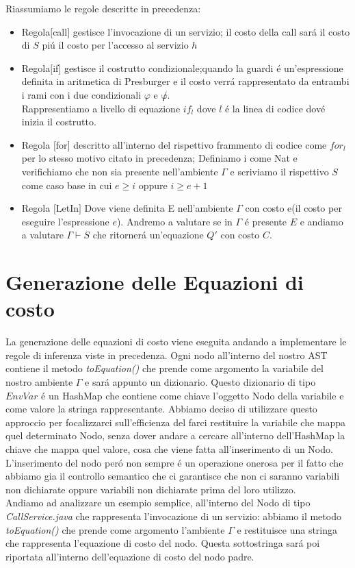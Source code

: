 \documentclass[../../main.tex]{subfiles}
\begin{document}
Riassumiamo le regole descritte in precedenza:\\
\begin{itemize}
    \item Regola$[$call$]$ gestisce l'invocazione di un servizio; il costo della call sará il costo di $S$ piú il costo per l'accesso al servizio $h$ 
    \item Regola$[$if$]$ gestisce il costrutto condizionale;quando la guardi é un'espressione definita in aritmetica di Presburger e il costo verrá rappresentato da entrambi i rami con i due condizionali $\varphi $ e $\not \varphi$.\\Rappresentiamo a livello di equazione $if_l$ dove $l$ é la linea di codice dové inizia il costrutto.
    \item Regola $[$for$]$ descritto all'interno del rispettivo frammento di codice come $for_l$ per lo stesso motivo citato in precedenza; Definiamo i come Nat e verifichiamo che non sia presente nell'ambiente $\varGamma$ e scriviamo il rispettivo $S$ come caso base in cui $e \geq i$ oppure $i \geq e + 1$
    \item Regola $[$LetIn$]$ Dove viene definita E nell'ambiente $\varGamma$ con costo e(il costo per eseguire l'espressione $e$). Andremo a valutare se in $\varGamma$ é presente $E$ e andiamo a valutare $\varGamma \vdash S$ che ritornerá un'equazione $Q'$ con costo $C$.
\end{itemize}
\section{Generazione delle Equazioni di costo}

La generazione delle equazioni di costo viene eseguita andando a implementare le regole di inferenza viste in precedenza.
Ogni nodo all'interno del nostro AST contiene il metodo \textit{toEquation()} che prende come argomento la variabile del nostro ambiente $\varGamma$ e sará appunto un dizionario.
Questo dizionario di tipo $EnvVar$ é un HashMap che contiene come chiave l'oggetto Nodo della variabile e come valore la stringa rappresentante.
Abbiamo deciso di utilizzare questo approccio per focalizzarci sull'efficienza del farci restituire la variabile che mappa quel determinato Nodo, senza dover andare a cercare all'interno dell'HashMap la chiave che mappa quel valore, cosa che viene fatta all'inserimento di un Nodo.
L'inserimento del nodo peró non sempre é un operazione onerosa per il fatto che abbiamo gia il controllo semantico che ci garantisce che non ci saranno variabili non dichiarate oppure variabili non dichiarate prima del loro utilizzo.\\
Andiamo ad analizzare un esempio semplice, all'interno del Nodo di tipo \textit{CallService.java} che rappresenta l'invocazione di un servizio: abbiamo il metodo \textit{toEquation()} che prende come argomento l'ambiente $\varGamma$ e restituisce una stringa che rappresenta l'equazione di costo del nodo. Questa sottostringa sará poi riportata all'interno dell'equazione di costo del nodo padre.
\end{document}
